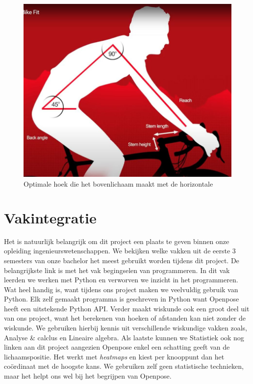 \documentclass[a4paper,twoside,kulak]{kulakreport}
\begin{document}
\begin{figure}[H]
	\centering
	\includegraphics[width=\textwidth]{bikefit_romp}
	\caption{Optimale hoek die het bovenlichaam maakt met de horizontale}
	\label{fig:bikefit_romp}
\end{figure}


\chapter{Vakintegratie}
Het is natuurlijk belangrijk om dit project een plaats te geven binnen onze opleiding ingenieurswetenschappen. We bekijken welke vakken uit de eerste 3 semesters van onze bachelor het meest gebruikt worden tijdens dit project. De belangrijkste link is met het vak begingselen van programmeren. In dit vak leerden we werken met Python en verworven we inzicht in het programmeren. Wat heel handig is, want tijdens ons project maken we veelvuldig gebruik van Python. Elk zelf gemaakt programma is geschreven in Python want Openpose heeft een uitstekende Python API. Verder maakt wiskunde ook een groot deel uit van ons project, want het berekenen van hoeken of afstanden kan niet zonder de wiskunde. We gebruiken hierbij kennis uit verschillende wiskundige vakken zoals, Analyse \& calclus en Lineaire algebra. Als laatste kunnen we Statistiek ook nog linken aan dit project aangezien Openpose enkel een schatting geeft van de lichaamspositie. Het werkt met \textit{heatmaps} en kiest per knooppunt dan het coördinaat met de hoogste kans. We gebruiken zelf geen statistische technieken, maar het helpt ons wel bij het begrijpen van Openpose.
\end{document}
